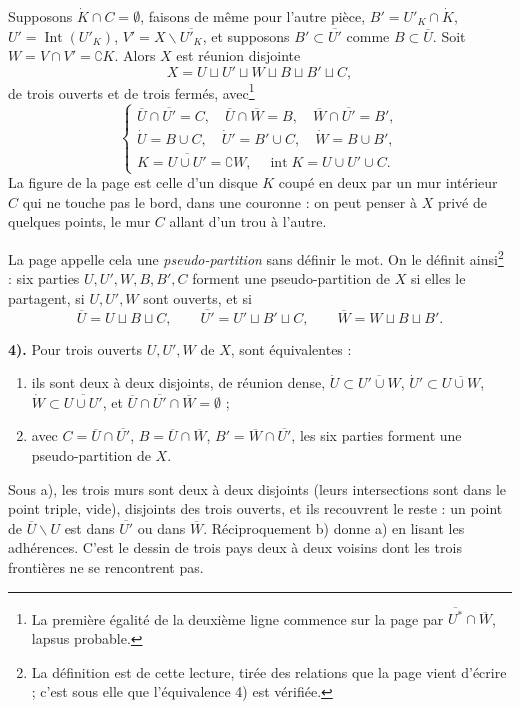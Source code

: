 \documentclass[11pt,a4paper]{article}
\begin{document}
Supposons $\dot{K} \cap C = \emptyset$, faisons de même pour l'autre pièce,
$B' = U'_K \cap \dot{K}$, $U' = \operatorname{Int}(U'_K)$, $V' = X
\smallsetminus \overline{U'_K}$, et supposons $B' \subset \overline{U'}$ comme
$B \subset \overline{U}$. Soit $W = V \cap V' = \complement K$. Alors $X$ est
réunion disjointe
\[
X = U \sqcup U' \sqcup W \sqcup B \sqcup B' \sqcup C ,
\]
de trois ouverts et de trois fermés, avec\footnote{La première égalité de la
deuxième ligne commence sur la page par $\overline{U^{*}} \cap
\overline{W}$, lapsus probable.}
\[
\left\{
\begin{array}{l}
\overline{U} \cap \overline{U'} = C, \quad \overline{U} \cap \overline{W} = B,
\quad \overline{W} \cap \overline{U'} = B', \\
\dot{U} = B \cup C, \quad \dot{U}' = B' \cup C, \quad \dot{W} = B \cup B', \\
K = \overline{U \cup U'} = \complement W, \quad \operatorname{int} K = U \cup
U' \cup C.
\end{array}
\right.
\]
La figure de la page
est celle d'un disque $K$ coupé en deux par un mur intérieur $C$ qui ne touche
pas le bord, dans une couronne : on peut penser à $X$ privé de quelques points,
le mur $C$ allant d'un trou à l'autre.

La page appelle cela une \emph{pseudo-partition} sans définir le mot. On le
définit ainsi\footnote{La définition est de cette lecture, tirée des relations
que la page vient d'écrire ; c'est sous elle que l'équivalence 4) est
vérifiée.} : six parties $U, U', W, B, B', C$ forment une pseudo-partition de
$X$ si elles le partagent, si $U, U', W$ sont ouverts, et si
\[
\overline{U} = U \sqcup B \sqcup C, \qquad \overline{U'} = U' \sqcup B' \sqcup
C, \qquad \overline{W} = W \sqcup B \sqcup B' .
\]

\textbf{4).} Pour trois ouverts $U, U', W$ de $X$, sont équivalentes :
\begin{enumerate}
  \item[a)] ils sont deux à deux disjoints, de réunion dense,
    $\dot{U} \subset \overline{U' \cup W}$, $\dot{U}' \subset \overline{U \cup
    W}$, $\dot{W} \subset \overline{U \cup U'}$, et $\overline{U} \cap
    \overline{U'} \cap \overline{W} = \emptyset$ ;
  \item[b)] avec $C = \overline{U} \cap \overline{U'}$, $B = \overline{U} \cap
    \overline{W}$, $B' = \overline{W} \cap \overline{U'}$, les six parties
    forment une pseudo-partition de $X$.
\end{enumerate}
Sous a), les trois murs sont deux à deux disjoints (leurs intersections sont
dans le point triple, vide), disjoints des trois ouverts, et ils recouvrent
le reste : un point de $\overline{U} \smallsetminus U$ est dans
$\overline{U'}$ ou dans $\overline{W}$. Réciproquement b) donne a) en lisant
les adhérences. C'est le dessin de trois pays deux à deux voisins dont les
trois frontières ne se rencontrent pas.
\end{document}
